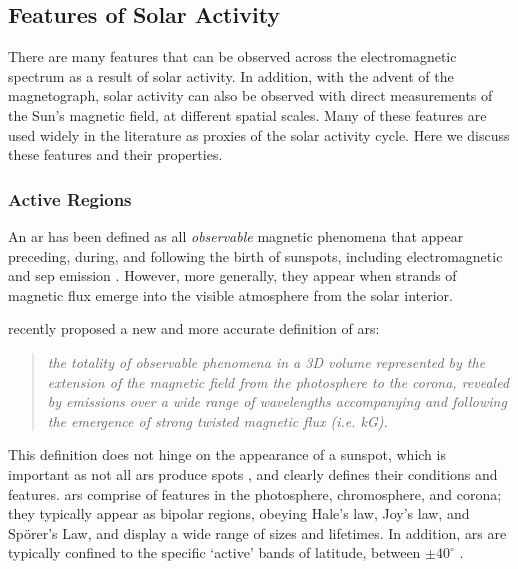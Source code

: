\subsection{Features of Solar Activity}

There are many features that can be observed across the electromagnetic spectrum as a result of solar activity. In addition, with the advent of the magnetograph, solar activity can also be observed with direct measurements of the Sun's magnetic field, at different spatial scales. Many of these features are used widely in the literature as proxies of the solar activity cycle. Here we discuss these features and their properties.

\glsresetall 
{}
\subsubsection*{Active Regions}

An \gls{ar} has been defined as all \textit{observable} magnetic phenomena that appear preceding, during, and following the birth of sunspots, including electromagnetic and \gls{sep} emission \citep{kiepenheuer_structure_1968}. However, more generally, they appear when strands of magnetic flux emerge into the visible atmosphere from the solar interior.%

\citet{van_driel-gesztelyi_evolution_2015} recently proposed a new and more accurate definition of \glspl{ar}:

\begin{quote}
	\textit{the totality of observable phenomena in a 3D volume represented by the extension of the magnetic field from the photosphere to the corona, revealed by emissions over a wide range of wavelengths accompanying and following the emergence of strong twisted magnetic flux (i.e. kG).}%
\end{quote}

This definition does not hinge on the appearance of a sunspot, which is important as not all \glspl{ar} produce spots \citep{van_driel-gesztelyi_evolution_2015}, and clearly defines their conditions and features. \glspl{ar} comprise of features in the photosphere, chromosphere, and corona; they typically appear as bipolar regions, obeying Hale's law, Joy's law, and Sp\"{o}rer's Law, and display a wide range of sizes and lifetimes. In addition, \glspl{ar} are typically confined to the specific `active' bands of latitude, between $\pm40^{\circ}$ \citep{harvey_solar_2001}.

